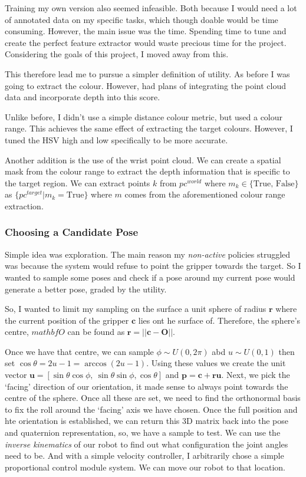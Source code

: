 Training my own version also seemed infeasible. Both because I would need a lot of annotated data on my specific tasks, which though doable would be time consuming. However, the main issue was the time. Spending time to tune and create the perfect feature extractor would waste precious time for the project. Considering the goals of this project, I moved away from this.

This therefore lead me to pursue a simpler definition of utility. As before  I was going to extract the colour. However, had plans of integrating the point cloud data and incorporate depth into this score.

Unlike before, I didn't use a simple distance colour metric, but used a colour range. This achieves the same effect of extracting the target colours. However, I tuned the HSV high and low specifically to be more accurate. 

Another addition is the use of the wrist point cloud. We can create a spatial mask from the colour range to extract the depth information that is specific to the target region. We can extract points $k$ from \( {pc}^{world}\) where \(m_k \in \{ \text{True, False} \}\) as \( \{ {pc}^{target} | m_k = \text{True} \} \) where $m$ comes from the aforementioned colour range extraction.

\subsubsection{Choosing a Candidate Pose}
Simple idea was exploration. The main reason my \emph{non-active} policies struggled was because the system would refuse to point the gripper towards the target. So I wanted to sample some poses and check if a pose around my current pose would generate a better pose, graded by the utility.

So, I wanted to limit my sampling on the surface a unit sphere of radius $\mathbf{r}$ where the current position of the gripper $\mathbf{c}$ lies ont he surface of. Therefore, the sphere's centre, $mathbf{O}$ can be found as \(\mathbf{r} = || \mathbf{c} - \mathbf{O} || \).

Once we have that centre, we can sample \(\phi \sim U\left(0, 2\pi\right)\) abd \(u\sim U\left(0, 1\right)\) then set \(\cos \theta = 2u - 1 = \arccos\left(2u - 1\right)\). Using these values we create the unit vector \(\mathbf{u} = \left[ \sin\theta\cos\phi, ~\sin\theta\sin\phi, \cos\theta\right]\) and \(\mathbf{p} = \mathbf{c} + \mathbf{ru}\). Next, we pick the `facing' direction of our orientation, it made sense to always point towards the centre of the sphere. Once all these are set, we need to find the orthonormal basis to fix the roll around the  `facing' axis we have chosen. Once the full position and hte orientation is established, we can return this 3D matrix back into the pose and quaternion representation, so, we have a sample to test. We can use the \emph{inverse kinematics} of our robot to find out what configuration the joint angles need to be. And with a simple velocity controller, I arbitrarily chose a simple proportional control module system. We can move our robot to that location.

